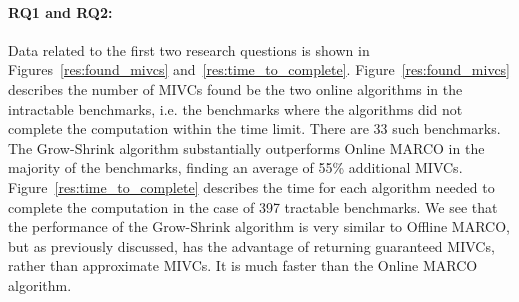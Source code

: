 \vspace{-5pt}
\paragraph{RQ1 and RQ2:}
Data related to the first two research questions is shown in Figures~\ref{res:found_mivcs} and~\ref{res:time_to_complete}.
Figure~\ref{res:found_mivcs} describes the number of MIVCs found be the two online algorithms in the intractable benchmarks, i.e. the benchmarks where the algorithms did not complete the computation within the time limit. There are 33 such benchmarks.
The Grow-Shrink algorithm substantially outperforms Online MARCO in the majority of the benchmarks, finding an average of 55\% additional MIVCs.
Figure~\ref{res:time_to_complete} describes the time for each algorithm needed to complete the computation in the case of 397 tractable benchmarks. We see that the performance of the Grow-Shrink algorithm is very similar to Offline MARCO, but as previously discussed, has the advantage of returning guaranteed MIVCs, rather than approximate MIVCs.  It is much faster than the Online MARCO algorithm.%


